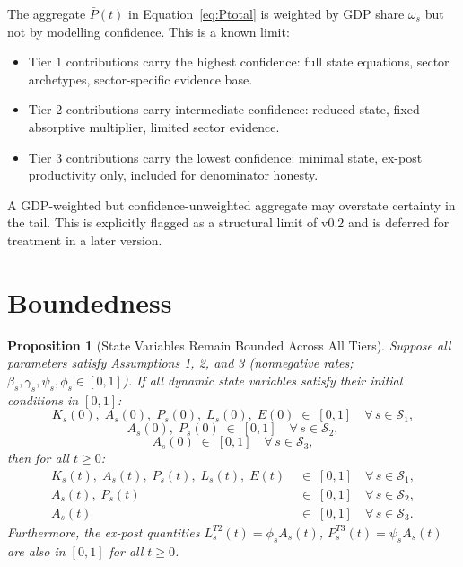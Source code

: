 \documentclass[11pt,a4paper]{article}
\newtheorem{proposition}{Proposition}
\begin{document}
The aggregate $\bar{P}(t)$ in Equation~\eqref{eq:Ptotal} is weighted by GDP share $\omega_s$ but not by modelling confidence. This is a known limit:
\begin{itemize}
  \item Tier 1 contributions carry the highest confidence: full state equations, sector archetypes, sector-specific evidence base.
  \item Tier 2 contributions carry intermediate confidence: reduced state, fixed absorptive multiplier, limited sector evidence.
  \item Tier 3 contributions carry the lowest confidence: minimal state, ex-post productivity only, included for denominator honesty.
\end{itemize}
A GDP-weighted but confidence-unweighted aggregate may overstate certainty in the tail. This is explicitly flagged as a structural limit of v0.2 and is deferred for treatment in a later version.

\section{Boundedness}
\label{sec:boundedness}

\begin{proposition}[State Variables Remain Bounded Across All Tiers]
\label{prop:boundedness_all}
Suppose all parameters satisfy Assumptions 1, 2, and 3 (nonnegative rates; $\beta_s, \gamma_s, \psi_s, \phi_s \in [0,1]$). If all dynamic state variables satisfy their initial conditions in $[0,1]$:
\[
K_s(0),\; A_s(0),\; P_s(0),\; L_s(0),\; E(0) \;\in\; [0,1] \quad \forall\, s \in \mathcal{S}_1,
\]
\[
A_s(0),\; P_s(0) \;\in\; [0,1] \quad \forall\, s \in \mathcal{S}_2,
\]
\[
A_s(0) \;\in\; [0,1] \quad \forall\, s \in \mathcal{S}_3,
\]
then for all $t \geq 0$:
\begin{align*}
K_s(t),\; A_s(t),\; P_s(t),\; L_s(t),\; E(t) &\;\in\; [0,1] \quad \forall\, s \in \mathcal{S}_1, \\
A_s(t),\; P_s(t) &\;\in\; [0,1] \quad \forall\, s \in \mathcal{S}_2, \\
A_s(t) &\;\in\; [0,1] \quad \forall\, s \in \mathcal{S}_3.
\end{align*}
Furthermore, the ex-post quantities $L_s^{T2}(t) = \phi_s A_s(t)$, $P_s^{T3}(t) = \psi_s A_s(t)$ are also in $[0,1]$ for all $t \geq 0$.
\end{proposition}
\end{document}
